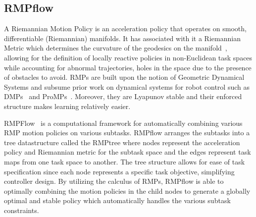 \subsection{RMPflow}

A Riemannian Motion Policy is an acceleration policy that operates on smooth, differentiable (\ie Riemannian) manifolds.
It has associated with it a Riemannian Metric which determines the curvature of the geodesics on the manifold~\cite{Ratliff18arxiv}, allowing for the definition of locally reactive policies in non-Euclidean task spaces while accounting for abnormal trajectories, \eg holes in the space due to the presence of obstacles to avoid. RMPs are built upon the notion of Geometric Dynamical Systems and subsume prior work on dynamical systems for robot control such as DMPs~\cite{Ijspeert13nc} and ProMPs~\cite{Paraschos13neurips}. Moreover, they are Lyapunov stable and their enforced structure makes learning relatively easier.

RMPFlow~\cite{Cheng21tase} is a computational framework for automatically combining various RMP motion policies on various subtasks. RMPflow arranges the subtasks into a tree datastructure called the RMPtree where nodes represent the acceleration policy and Riemannian metric for the subtask space and the edges represent task maps from one task space to another. The tree structure allows for ease of task specification since each node represents a specific task objective, simplifying controller design. By utilizing the calculus of RMPs, RMPflow is able to optimally combining the motion policies in the child nodes to generate a globally optimal and stable policy which automatically handles the various subtask constraints.